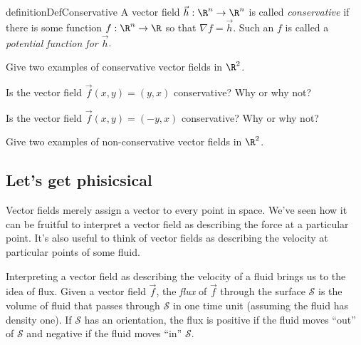 \begin{restatable*}{definition}{DefConservative}
	A vector field $\vec h:\R^n\to\R^n$ is called \emph{conservative}
	if there is some function $f:\R^n\to\R$ so that $\nabla f=\vec h$.
	Such an $f$ is called a \emph{potential function for $\vec h$}.
\end{restatable*}

\begin{question}
	\begin{parts}
		\item Give two examples of conservative vector fields in $\R^2$.
		\item Is the vector field $\vec f(x,y) = (y,x)$ conservative?
			Why or why not?
		\item Is the vector field $\vec f(x,y) = (-y,x)$ conservative?
			Why or why not?
		\item Give two examples of non-conservative vector fields in $\R^2$.
	\end{parts}
\end{question}

\subsection*{Let's get phisicsical}
	Vector fields merely assign a vector to every point in space.  We've
	seen how it can be fruitful to interpret a vector field as describing
	the force at a particular point.  It's also useful to think of vector
	fields as describing the velocity at particular points of some fluid.

	Interpreting a vector field as describing the velocity of a fluid brings
	us to the idea of flux.  Given a vector field $\vec f$,
	the \emph{flux} of $\vec f$ through the surface $\mathcal S$ is the volume of fluid
	that passes through $\mathcal S$ in one time unit (assuming the fluid has density one).
	If $\mathcal S$ has an orientation, the flux is positive if the fluid moves ``out''
	of $\mathcal S$ and negative if the fluid moves ``in'' $\mathcal S$.

